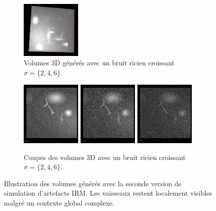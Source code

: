 \begin{figure}
\begin{subfigure}{\textwidth}
  \includegraphics[width=0.32\textwidth]{Images/gen_vascu_V2_r6.png}
  \caption{Volumes 3D générés avec un bruit ricien croissant $\sigma=\{2, 4, 6\}$.}
\end{subfigure}
\begin{subfigure}{\textwidth}
  \includegraphics[width=0.32\textwidth]{Images/gen_vascu_V2_r2_2D.png}
  \includegraphics[width=0.32\textwidth]{Images/gen_vascu_V2_r4_2D.png}
  \includegraphics[width=0.32\textwidth]{Images/gen_vascu_V2_r6_2D.png}
  \caption{Coupes des volumes 3D avec un bruit ricien croissant $\sigma=\{2, 4, 6\}$.}
\end{subfigure}
\caption{Illustration des volumes générés avec la seconde version de simulation d'artefacts IRM. Les vaisseaux restent localement visibles malgré un contexte global complexe.}
\label{fig:vascuSynth_results_V2}
\end{figure}
